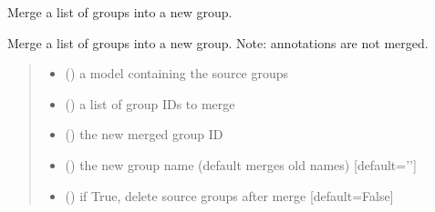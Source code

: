 \documentclass[letterpaper,12pt,english]{sphinxmanual}
\begin{document}

\begin{fulllineitems}
\label{\detokenize{api/core:cbmpy.CBTools.mergeGroups}}
\pysigstartsignatures
\pysiglinewithargsret
{}
{\sphinxparamcomma {}\sphinxparamcomma {}\sphinxparamcomma {}\sphinxparamcomma {}}
{}
\pysigstopsignatures
\sphinxAtStartPar
Merge a list of groups into a new group.

\sphinxAtStartPar
Merge a list of groups into a new group. Note: annotations are not merged.
\begin{quote}\begin{description}
\begin{itemize}
\item {} 
\sphinxAtStartPar
{} () \textendash{} a model containing the source groups

\item {} 
\sphinxAtStartPar
{} () \textendash{} a list of group IDs to merge

\item {} 
\sphinxAtStartPar
{} () \textendash{} the new merged group ID

\item {} 
\sphinxAtStartPar
{} (\sphinxstyleliteralemphasis{\sphinxupquote{, }}) \textendash{} the new group name (default merges old names) {[}default=’’{]}

\item {} 
\sphinxAtStartPar
{} (\sphinxstyleliteralemphasis{\sphinxupquote{, }}) \textendash{} if True, delete source groups after merge {[}default=False{]}


\end{itemize}
\end{description}
\end{quote}
\end{fulllineitems}
\end{document}
